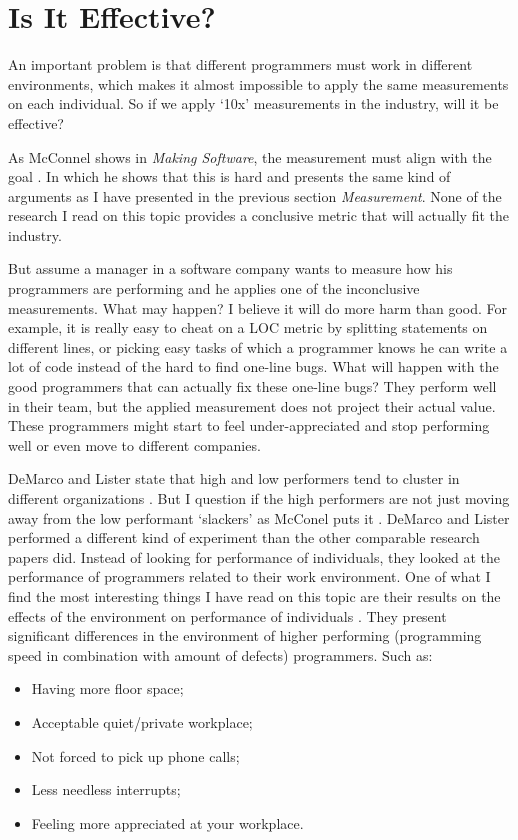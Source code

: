 \section*{Is It Effective?}

An important problem is that different programmers must work in different environments,
which makes it almost impossible to apply the same measurements on each individual.
So if we apply `10x' measurements in the industry, will it be effective?

As McConnel shows in \textit{Making Software}, the measurement must align with the goal \autocite[570-571]{MAKING_SOFTWARE}.
In which he shows that this is hard and presents the same kind of arguments as I have presented in the previous section \textit{Measurement}.
None of the research I read on this topic provides a conclusive metric that will actually fit the industry.

But assume a manager in a software company wants to measure how his programmers are performing and he applies one of the inconclusive measurements.
What may happen? I believe it will do more harm than good.
For example, it is really easy to cheat on a LOC metric by splitting statements on different lines, or picking easy tasks of which a programmer knows he can write a lot of code instead of the hard to find one-line bugs.
What will happen with the good programmers that can actually fix these one-line bugs?
They perform well in their team, but the applied measurement does not project their actual value.
These programmers might start to feel under-appreciated and stop performing well or even move to different companies.

DeMarco and Lister state that high and low performers tend to cluster in different organizations \autocite[268]{demarco1985programmer}.
But I question if the high performers are not just moving away from the low performant `slackers' as McConel puts it \autocite[569]{MAKING_SOFTWARE}.
DeMarco and Lister performed a different kind of experiment than the other comparable research papers did.
Instead of looking for performance of individuals, they looked at the performance of programmers related to their work environment.
One of what I find the most interesting things I have read on this topic are their results on the effects of the environment on performance of individuals \autocite[271]{demarco1985programmer}.
They present significant differences in the environment of higher performing (programming speed in combination with amount of defects) programmers. Such as:
\begin{itemize}[noitemsep]
\item Having more floor space;
\item Acceptable quiet/private workplace;
\item Not forced to pick up phone calls;
\item Less needless interrupts;
\item Feeling more appreciated at your workplace.
\end{itemize}

